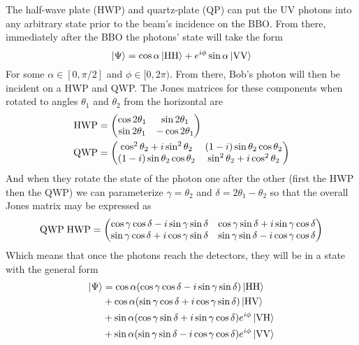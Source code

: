 \documentclass{paper}[11pt]
\begin{document}
	The half-wave plate (HWP) and quartz-plate (QP) can put the UV photons into any arbitrary state prior to the beam's incidence on the BBO. From there, immediately after the BBO the photons' state will take the form
	\begin{equation}
		\ket{\Psi} = \cos\alpha\ket{\text{HH}} + e^{i\phi}\sin\alpha\ket{\text{VV}} \notag
	\end{equation}
	For some $\alpha\in[0,\pi/2]$ and $\phi\in[0,2\pi)$. From there, Bob's photon will then be incident on a HWP and QWP. The Jones matrices for these components when rotated to angles $\theta_1$ and $\theta_2$ from the horizontal are
	\begin{align}
		\text{\rmfamily HWP\normalfont} &= \begin{pmatrix}
			\cos 2\theta_1 & \sin2\theta_1 \\
			\sin2\theta_1 & -\cos2\theta_1
		\end{pmatrix} \notag \\
		\text{\rmfamily QWP\normalfont} &= \begin{pmatrix}
			\cos^2\theta_2 + i\sin^2\theta_2 & (1-i)\sin\theta_2\cos\theta_2 \\
			(1-i)\sin\theta_2\cos\theta_2 & \sin^2\theta_2 + i\cos^2\theta_2
		\end{pmatrix} \notag
	\end{align}
	And when they rotate the state of the photon one after the other (first the HWP then the QWP) we can parameterize $\gamma=\theta_2$ and $\delta=2\theta_1-\theta_2$ so that the overall Jones matrix may be expressed as
	\begin{equation}
		\text{\rmfamily QWP\normalfont}\;\text{\rmfamily HWP\normalfont} = \begin{pmatrix}
			\cos\gamma\cos\delta-i\sin\gamma\sin\delta & \cos\gamma\sin\delta + i\sin\gamma\cos\delta \\
			\sin\gamma\cos\delta + i \cos\gamma\sin\delta & \sin\gamma\sin\delta - i \cos\gamma\cos\delta \label{eq:bobs CWPs jones matrix}
		\end{pmatrix}
	\end{equation}
	Which means that once the photons reach the detectors, they will be in a state with the general form
	\begin{align}
		\ket{\Psi} &= \cos\alpha(\cos\gamma\cos\delta-i\sin\gamma\sin\delta)\ket{\text{HH}} \notag\\
		& + \cos\alpha(\sin\gamma\cos\delta + i\cos\gamma\sin\delta)\ket{\text{HV}} \notag\\
		& + \sin\alpha(\cos\gamma\sin\delta + i\sin\gamma\cos\delta)e^{i\phi}\ket{\text{VH}} \notag\\
		& + \sin\alpha(\sin\gamma\sin\delta - i \cos\gamma\cos\delta)e^{i\phi} \ket{\text{VV}} \label{eq:general product state}
	\end{align}
	
\end{document}
